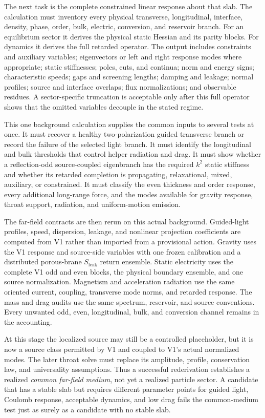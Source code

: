 The next task is the complete constrained linear response about that slab. The
calculation must inventory every physical transverse, longitudinal, interface,
density, phase, order, bulk, electric, conversion, and reservoir branch. For an
equilibrium sector it derives the physical static Hessian and its parity blocks.
For dynamics it derives the full retarded operator. The output includes
constraints and auxiliary variables; eigenvectors or left and right response
modes where appropriate; static stiffnesses; poles, cuts, and continua; norm and
energy signs; characteristic speeds; gaps and screening lengths; damping and
leakage; normal profiles; source and interface overlaps; flux normalizations;
and observable residues. A sector-specific truncation is acceptable only after
this full operator shows that the omitted variables decouple in the stated
regime.

This one background calculation supplies the common inputs to several tests at
once. It must recover a healthy two-polarization guided transverse branch or
record the failure of the selected light branch. It must identify the
longitudinal and bulk thresholds that control helper radiation and drag. It must
show whether a reflection-odd source-coupled eigenbranch has the required
\(k^2\) static stiffness and whether its retarded completion is propagating,
relaxational, mixed, auxiliary, or constrained. It must classify the even
thickness and order response, every additional long-range force, and the modes
available for gravity response, throat support, radiation, and uniform-motion
emission.

The far-field contracts are then rerun on this actual background. Guided-light
profiles, speed, dispersion, leakage, and nonlinear projection coefficients are
computed from V1 rather than imported from a provisional action. Gravity uses
the V1 response and source-side variables with one frozen calibration and a
distributed porous-brane \(S_{\mathrm{leak}}\) return ensemble. Static
electricity uses the complete V1 odd and even blocks, the
physical boundary ensemble, and one source normalization. Magnetism and
acceleration radiation use the same oriented current, coupling, transverse mode
norms, and retarded response. The mass and drag audits use the same spectrum,
reservoir, and source conventions. Every unwanted odd, even, longitudinal,
bulk, and conversion channel remains in the accounting.

At this stage the localized source may still be a controlled placeholder, but it
is now a source class permitted by V1 and coupled to V1's actual normalized
modes. The later throat solve must replace its amplitude, profile,
conservation law, and universality assumptions. Thus a successful rederivation
establishes a realized \emph{common far-field medium}, not yet a realized
particle sector. A candidate that has a stable slab but requires different
parameter points for guided light, Coulomb response, acceptable dynamics, and
low drag fails the common-medium test just as surely as a candidate with no
stable slab.

